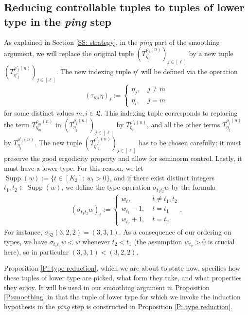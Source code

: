 \documentclass[11pt]{amsart}
\theoremstyle{definition}
\newcommand{\FL}{{\mathfrak L}}
\DeclareMathOperator{\supp}{Supp}
\newcommand{\brac}[1]{\mathopen{}\left( #1 \mathclose{}\right)}
\begin{document}
\subsection{Reducing controllable tuples to tuples of lower type in the \textit{ping} step}\label{SS:ping}
As explained in Section \ref{SS: strategy}, in the \textit{ping} part of the smoothing argument, we will replace the original tuple $\brac{T_{\eta_j}^{\rho_j(n)}}_{j\in[\ell]}$ by a new tuple $\brac{T_{\eta'_j}^{\rho'_j(n)}}_{j\in[\ell]}$. The new indexing tuple $\eta'$ will be defined via the operation
\begin{align}\label{definition tau}
    (\tau_{mi}\eta)_j := \begin{cases} \eta_j,\; &j\neq m\\ \eta_i,\; &j = m
    \end{cases}
\end{align}
for some distinct values $m, i\in\FL$. This indexing tuple corresponds to replacing the term $T_{\eta_m}^{\rho_m(n)}$ in $\brac{T_{\eta_j}^{\rho_j(n)}}_{j\in[\ell]}$ by $T_{\eta_i}^{\rho'_i(n)}$, and all the other terms $T_{\eta_j}^{\rho_j(n)}$ by $T_{\eta_j}^{\rho'_j(n)}$. The new tuple $\brac{T_{\eta'_j}^{\rho'_j(n)}}_{j\in[\ell]}$ has to be chosen carefully: it must preserve the good ergodicity property and allow for seminorm control. Lastly, it must have a lower type. For this reason, we let $\supp(w):= \{t\in[K_2]:\ w_t>0\}$, and if there exist distinct integers $t_1,t_2\in \supp(w)$, we define the type operation $\sigma_{t_1 t_2}w$ by the formula
\begin{align}\label{definition sigma}
    (\sigma_{t_1 t_2}w)_t := \begin{cases} w_t,\; &t \neq t_1, t_2\\
    w_{t_1}-1,\; &t = t_1\\
    w_{t_2} + 1,\; &t = t_2.
    \end{cases}.
\end{align}
For instance, $\sigma_{32}(3, 2, 2) = (3, 3, 1)$. As a consequence of our ordering on types, we have $\sigma_{t_1 t_2}w < w$ whenever $t_2 < t_1$ (the assumption $w_{t_2}>0$ is crucial here), so in particular $(3, 3, 1) < (3, 2, 2)$.

Proposition \ref{P: type reduction}, which we are about to state now, specifies how these tuples of lower type are picked, what form they take, and what properties they enjoy. It will be used in our smoothing argument in Proposition \ref{P:smoothing} in that the tuple of lower type for which we invoke the induction hypothesis in the \textit{ping} step is constructed in Proposition \ref{P: type reduction}.
\end{document}
